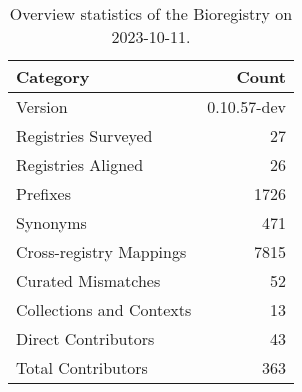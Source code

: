 \begin{table}
\caption{Overview statistics of the Bioregistry on 2023-10-11.}
\label{tab:bioregistry-summary}
\begin{tabular}{lr}
\toprule
Category & Count \\
\midrule
Version & 0.10.57-dev \\
Registries Surveyed & 27 \\
Registries Aligned & 26 \\
Prefixes & 1726 \\
Synonyms & 471 \\
Cross-registry Mappings & 7815 \\
Curated Mismatches & 52 \\
Collections and Contexts & 13 \\
Direct Contributors & 43 \\
Total Contributors & 363 \\
\bottomrule
\end{tabular}
\end{table}
